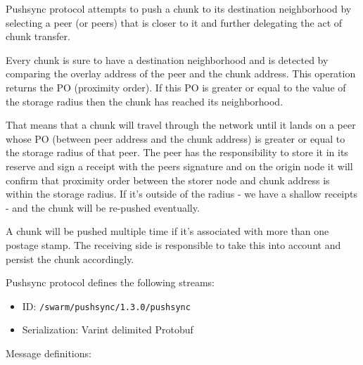 
Pushsync protocol attempts to push a chunk to its destination
neighborhood by selecting a peer (or peers) that is closer to it and
further delegating the act of chunk transfer.

Every chunk is sure to have a destination neighborhood and is detected
by comparing the overlay address of the peer and the chunk address. This
operation returns the PO (proximity order). If this PO is greater or
equal to the value of the storage radius then the chunk has reached its
neighborhood.

That means that a chunk will travel through the network until it lands
on a peer whose PO (between peer address and the chunk address) is
greater or equal to the storage radius of that peer. The peer has the
responsibility to store it in its reserve and sign a receipt with the
peers signature and on the origin node it will confirm that proximity
order between the storer node and chunk address is within the storage
radius. If it's outside of the radius - we have a shallow receipts - and
the chunk will be re-pushed eventually.

A chunk will be pushed multiple time if it's associated with more than 
one postage stamp. The receiving side is responsible to take this into 
account and persist the chunk accordingly.

Pushsync protocol defines the following streams:
\begin{itemize}
    \item ID: \texttt{/swarm/pushsync/1.3.0/pushsync}
    \item Serialization: Varint delimited Protobuf
\end{itemize}

Message definitions:
\begin{Shaded}
\begin{Highlighting}[]
\NormalTok{;}


  \NormalTok{;}
  \NormalTok{;}
  \NormalTok{;}
\NormalTok{\}}

  \NormalTok{;}
  \NormalTok{;}
  \NormalTok{;}
  \NormalTok{;}
\NormalTok{\}}
\end{Highlighting}
\end{Shaded}

